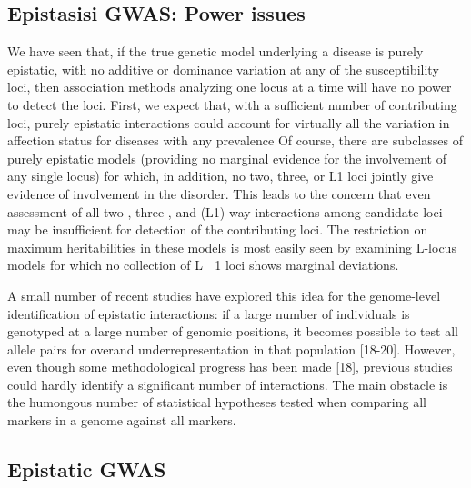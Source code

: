 \subsection{Epistasisi GWAS: Power issues}
 We have seen that, if the true genetic model underlying a disease is purely epistatic, with no additive or dominance variation at any of the susceptibility loci, then association methods analyzing one locus at a time will have no power to detect the loci.  \cite{culverhouse2002perspective}
First, we expect that, with a sufficient number of contributing loci, purely epistatic interactions could account for virtually all the variation in affection status for diseases with any prevalence \cite{culverhouse2002perspective}
Of course, there are subclasses of purely epistatic models (providing no marginal evidence for the involvement of any single locus) for which, in addition, no two, three, or L1 loci jointly give evidence of involvement in the disorder. This leads to the concern that even assessment of all two-, three-, and (L1)-way interactions among candidate loci may be insufficient for detection of the contributing loci. \cite{culverhouse2002perspective}
The restriction on maximum heritabilities in these models is most easily seen by examining L-locus models for which no collection of L 􏰂 1 loci shows marginal deviations.  \cite{culverhouse2002perspective}

A small number of recent studies have explored this idea for the genome-level identification of epistatic interactions: if a large number of individuals is genotyped at a large number of genomic positions, it becomes possible to test all allele pairs for overand underrepresentation in that population [18-20]. \cite{ackermann2012systematic}
However, even though some methodological progress has been made [18], previous studies could hardly identify a significant number of interactions. The main obstacle is the humongous number of statistical hypotheses tested when comparing all markers in a genome against all markers. \cite{ackermann2012systematic}

\subsection{Epistatic GWAS \label{sec:epigwas}}

